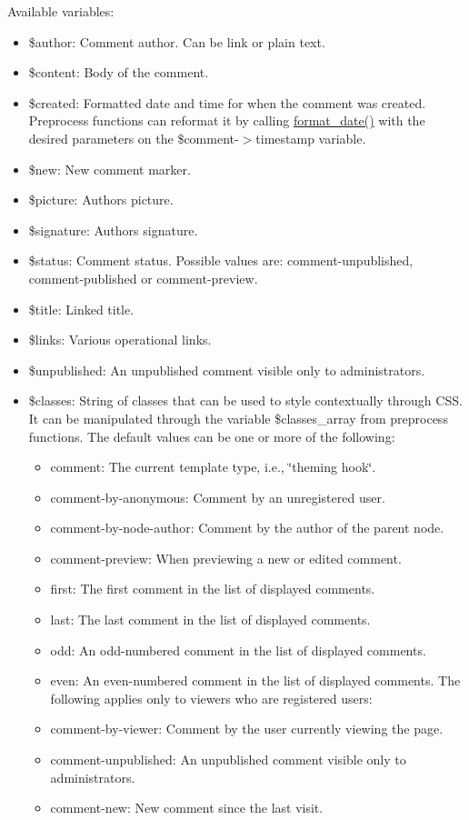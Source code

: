 Available variables:\begin{itemize}
\item \$author: Comment author. Can be link or plain text.\item \$content: Body of the comment.\item \$created: Formatted date and time for when the comment was created. Preprocess functions can reformat it by calling \hyperlink{group__format_g40553742a67f9c79c4669b9053fe202c}{format\_\-date()} with the desired parameters on the \$comment-$>$timestamp variable.\item \$new: New comment marker.\item \$picture: Authors picture.\item \$signature: Authors signature.\item \$status: Comment status. Possible values are: comment-unpublished, comment-published or comment-preview.\item \$title: Linked title.\item \$links: Various operational links.\item \$unpublished: An unpublished comment visible only to administrators.\item \$classes: String of classes that can be used to style contextually through CSS. It can be manipulated through the variable \$classes\_\-array from preprocess functions. The default values can be one or more of the following:\begin{itemize}
\item comment: The current template type, i.e., \char`\"{}theming hook\char`\"{}.\item comment-by-anonymous: Comment by an unregistered user.\item comment-by-node-author: Comment by the author of the parent node.\item comment-preview: When previewing a new or edited comment.\item first: The first comment in the list of displayed comments.\item last: The last comment in the list of displayed comments.\item odd: An odd-numbered comment in the list of displayed comments.\item even: An even-numbered comment in the list of displayed comments. The following applies only to viewers who are registered users:\item comment-by-viewer: Comment by the user currently viewing the page.\item comment-unpublished: An unpublished comment visible only to administrators.\item comment-new: New comment since the last visit.\end{itemize}
\end{itemize}


